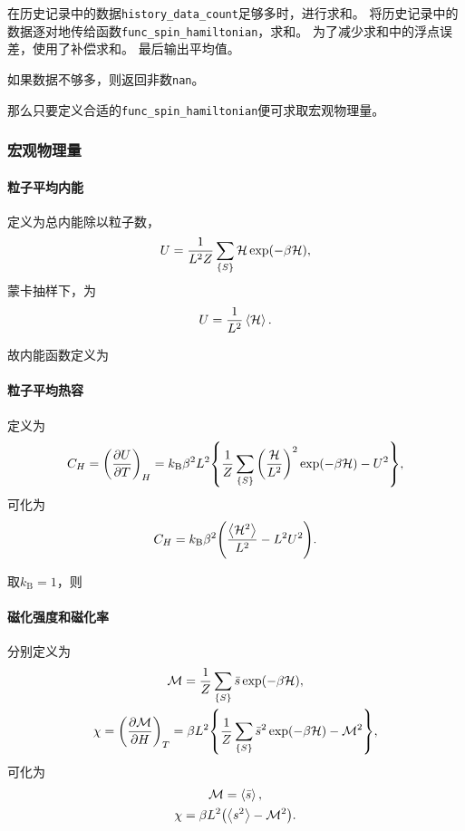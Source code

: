 \documentclass[a4paper,unicode]{report}
\begin{document}
在历史记录中的数据\verb|history_data_count|足够多时，进行求和。
将历史记录中的数据逐对地传给函数\verb|func_spin_hamiltonian|，求和。
为了减少求和中的浮点误差，使用了补偿求和。
最后输出平均值。

如果数据不够多，则返回非数\verb|nan|。

那么只要定义合适的\verb|func_spin_hamiltonian|便可求取宏观物理量。

\subsubsection{宏观物理量}

\paragraph{粒子平均内能}
定义为总内能除以粒子数，
\begin{equation}
    U = \frac{1}{L^2Z} \sum_\qty{S} \mathcal{H} \exp(-\beta \mathcal{H}),
\end{equation}
蒙卡抽样下，为
\begin{equation}
    U = \frac{1}{L^2}\expval{\mathcal{H}}.
\end{equation}

故内能函数定义为
{
    \linespread{1.0}
    
}

\paragraph{粒子平均热容}
定义为
\begin{equation}
    C_H = \qty(\pdv{U}{T})_H = k_\text{B}\beta^2 L^2\qty{ \frac{1}{Z} \sum_\qty{S} \qty(\frac{\mathcal{H}}{L^2})^2 \exp(-\beta \mathcal{H}) - U^2},
\end{equation}
可化为
\begin{equation}
    C_H = k_\text{B}\beta^2\qty(\frac{\expval{\mathcal{H}^2}}{L^2} - L^2U^2).
\end{equation}

取$k_\text{B}=1$，则
{
    \linespread{1.0}
    
}

\paragraph{磁化强度和磁化率}
分别定义为
\begin{gather}
    \mathcal{M} = \frac{1}{Z} \sum_\qty{S} \bar{s} \exp(-\beta \mathcal{H}),\\
    \chi = \qty(\pdv{\mathcal{M}}{H})_T = \beta L^2\qty{ \frac{1}{Z} \sum_\qty{S} \bar{s}^2 \exp(-\beta \mathcal{H}) - \mathcal{M}^2},
\end{gather}
可化为
\begin{gather}
    \mathcal{M} = \expval{\bar{s}},\\
    \chi = \beta L^2\qty(\expval{s^2} - \mathcal{M}^2).
\end{gather}
\end{document}
